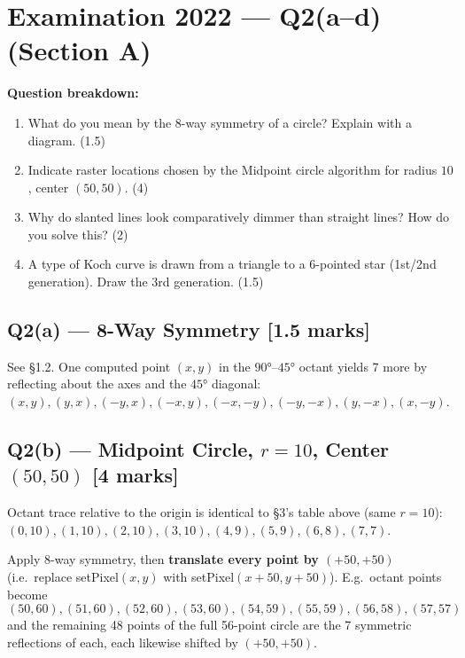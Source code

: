\documentclass[12pt, a4paper]{article}
\newenvironment{solutionbox}{\begin{mdframed}[style=solutionframe]}{\end{mdframed}}
\newenvironment{answerbox}{\begin{mdframed}[style=answerframe]}{\end{mdframed}}
\begin{document}
\section{Examination 2022 --- Q2(a--d) (Section A)}
\begin{solutionbox}
\textbf{Question breakdown:}
\begin{enumerate}[noitemsep]
  \item[(a)] What do you mean by the 8-way symmetry of a circle? Explain with a diagram. (1.5)
  \item[(b)] Indicate raster locations chosen by the Midpoint circle algorithm for radius $10$, center $(50,50)$. (4)
  \item[(c)] Why do slanted lines look comparatively dimmer than straight lines? How do you solve this? (2)
  \item[(d)] A type of Koch curve is drawn from a triangle to a 6-pointed star (1st/2nd generation). Draw the 3rd generation. (1.5)
\end{enumerate}
\end{solutionbox}

\subsection*{Q2(a) --- 8-Way Symmetry [1.5 marks]}
See \S1.2. One computed point $(x,y)$ in the $90°$--$45°$ octant yields 7 more by reflecting about the axes and the $45°$ diagonal: $(x,y),(y,x),(-y,x),(-x,y),(-x,-y),(-y,-x),(y,-x),(x,-y)$.

\subsection*{Q2(b) --- Midpoint Circle, $r=10$, Center $(50,50)$ [4 marks]}
\begin{solutionbox}
Octant trace relative to the origin is identical to \S3's table above (same $r=10$): $(0,10),(1,10),(2,10),(3,10),(4,9),(5,9),(6,8),(7,7)$.
\end{solutionbox}
\begin{answerbox}
Apply 8-way symmetry, then \textbf{translate every point by $(+50,+50)$} (i.e.\ replace setPixel$(x,y)$ with setPixel$(x{+}50,y{+}50)$). E.g.\ octant points become
$$(50,60),(51,60),(52,60),(53,60),(54,59),(55,59),(56,58),(57,57)$$
and the remaining 48 points of the full 56-point circle are the 7 symmetric reflections of each, each likewise shifted by $(+50,+50)$.
\end{answerbox}
\end{document}

